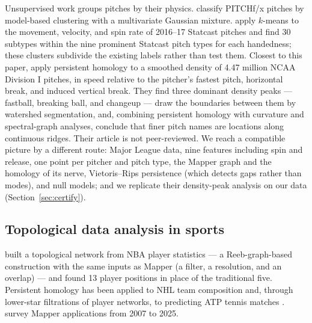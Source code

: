 \documentclass{article}
\theoremstyle{definition}
\theoremstyle{remark}
\begin{document}
Unsupervised work groups pitches by their physics.
\textcite{pane2013trouble} classify PITCHf/x pitches by model-based clustering with a multivariate Gaussian mixture.
\textcite{camp2020clustering} apply $k$-means to the movement, velocity, and spin rate of 2016--17 Statcast pitches and find 30 subtypes within the nine prominent Statcast pitch types for each handedness; these clusters subdivide the existing labels rather than test them.
Closest to this paper, \textcite{maloof2026classify} apply persistent homology to a smoothed density of 4.47 million NCAA Division I pitches, in speed relative to the pitcher's fastest pitch, horizontal break, and induced vertical break.
They find three dominant density peaks --- fastball, breaking ball, and changeup --- draw the boundaries between them by watershed segmentation, and, combining persistent homology with curvature and spectral-graph analyses, conclude that finer pitch names are locations along continuous ridges.
Their article is not peer-reviewed.
We reach a compatible picture by a different route: Major League data, nine features including spin and release, one point per pitcher and pitch type, the Mapper graph and the homology of its nerve, Vietoris--Rips persistence (which detects gaps rather than modes), and null models; and we replicate their density-peak analysis on our data (Section~\ref{sec:certify}).

\subsection{Topological data analysis in sports}
\textcite{lum2013extracting} built a topological network from NBA player statistics --- a Reeb-graph-based construction with the same inputs as Mapper (a filter, a resolution, and an overlap) --- and found 13 player positions in place of the traditional five.
Persistent homology has been applied to NHL team composition \parencite{goldfarb2014hockey} and, through lower-star filtrations of player networks, to predicting ATP tennis matches \parencite{schwaderer2026tennis}.
\textcite{madukpe2026review} survey Mapper applications from 2007 to 2025.
\end{document}
